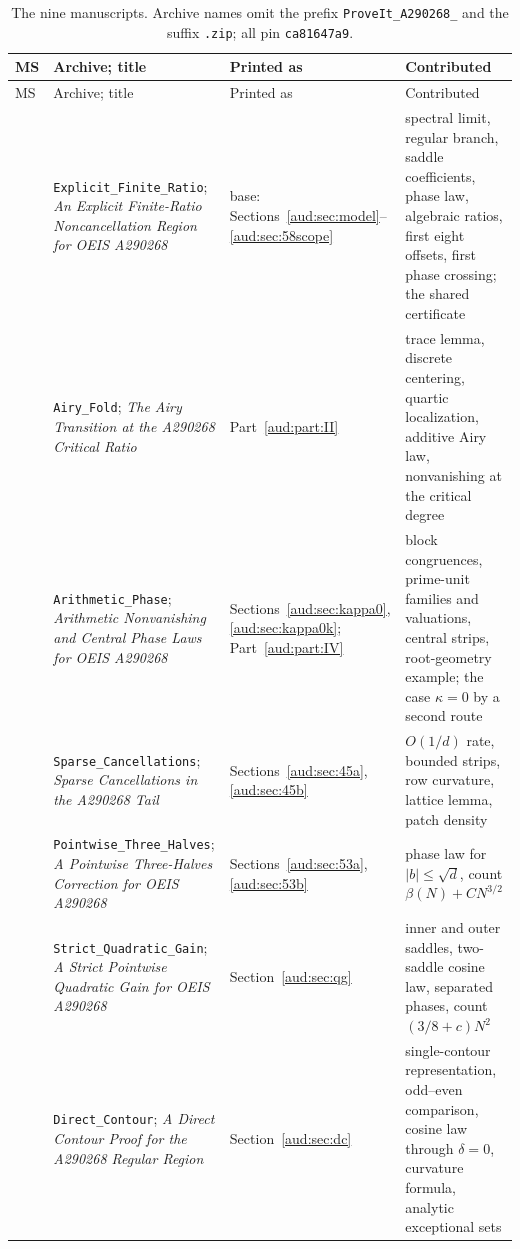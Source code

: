 \documentclass[11pt,a4paper]{article}
\numberwithin{equation}{section}
\begin{document}
{\small
\begin{longtable}{@{}>{\raggedright\arraybackslash}p{}
 >{\raggedright\arraybackslash}p{}
 >{\raggedright\arraybackslash}p{}
 >{\raggedright\arraybackslash}p{}@{}}
\caption{The nine manuscripts. Archive names omit the prefix \texttt{ProveIt\_A290268\_} and the suffix \texttt{.zip}; all pin \texttt{ca81647a9}.}\label{aud:tab:provenance}\\
\toprule
MS & Archive; title & Printed as & Contributed\\
\midrule\endfirsthead
\toprule
MS & Archive; title & Printed as & Contributed\\
\midrule\endhead
58 & \texttt{Explicit\_\allowbreak Finite\_\allowbreak Ratio}; \emph{An Explicit Finite-Ratio Noncancellation Region for OEIS A290268} & base: Sections~\ref{aud:sec:model}--\ref{aud:sec:58scope} & spectral limit, regular branch, saddle coefficients, phase law, algebraic ratios, first eight offsets, first phase crossing; the shared certificate\\
54 & \texttt{Airy\_\allowbreak Fold}; \emph{The Airy Transition at the A290268 Critical Ratio} & Part~\ref{aud:part:II} & trace lemma, discrete centering, quartic localization, additive Airy law, nonvanishing at the critical degree\\
64 & \texttt{Arithmetic\_\allowbreak Phase}; \emph{Arithmetic Nonvanishing and Central Phase Laws for OEIS A290268} & Sections~\ref{aud:sec:kappa0}, \ref{aud:sec:kappa0k}; Part~\ref{aud:part:IV} & block congruences, prime-unit families and valuations, central strips, root-geometry example; the case $\kappa=0$ by a second route\\
45 & \texttt{Sparse\_\allowbreak Cancellations}; \emph{Sparse Cancellations in the A290268 Tail} & Sections~\ref{aud:sec:45a}, \ref{aud:sec:45b} & $O(1/d)$ rate, bounded strips, row curvature, lattice lemma, patch density\\
53 & \texttt{Pointwise\_\allowbreak Three\_\allowbreak Halves}; \emph{A Pointwise Three-Halves Correction for OEIS A290268} & Sections~\ref{aud:sec:53a}, \ref{aud:sec:53b} & phase law for $|b|\le\sqrt d$, count $\beta(N)+CN^{3/2}$\\
49 & \texttt{Strict\_\allowbreak Quadratic\_\allowbreak Gain}; \emph{A Strict Pointwise Quadratic Gain for OEIS A290268} & Section~\ref{aud:sec:qg} & inner and outer saddles, two-saddle cosine law, separated phases, count $(3/8+c)N^2$\\
40 & \texttt{Direct\_\allowbreak Contour}; \emph{A Direct Contour Proof for the A290268 Regular Region} & Section~\ref{aud:sec:dc} & single-contour representation, odd--even comparison, cosine law through $\delta=0$, curvature formula, analytic exceptional sets\\

\end{longtable}}
\end{document}
